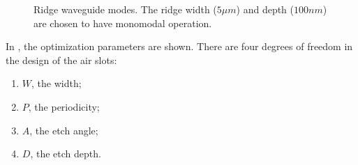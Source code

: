 \begin{figure}[htbp]
  \begin{center}
  \end{center}
  \caption{Ridge waveguide modes. The ridge width ($5 \mu m$) and
  depth ($100 nm$) are chosen to have monomodal operation.}
  \label{fig:polrot_ridge}
\end{figure}

In , the optimization parameters are
shown. There are four degrees of freedom in the design of the air slots:
\begin{enumerate}
\item $W$, the width;
\item $P$, the periodicity;
\item $A$, the etch angle;
\item $D$, the etch depth.
\end{enumerate}

